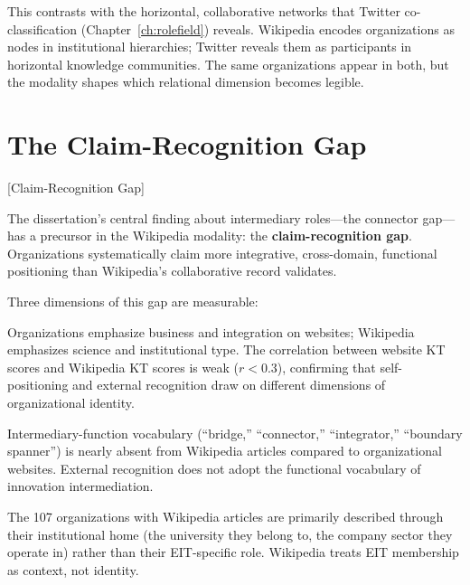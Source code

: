 \documentclass[../main.tex]{subfiles}
\begin{document}
This contrasts with the horizontal, collaborative networks that Twitter co-classification (Chapter~\ref{ch:rolefield}) reveals. Wikipedia encodes organizations as nodes in institutional hierarchies; Twitter reveals them as participants in horizontal knowledge communities. The same organizations appear in both, but the modality shapes which relational dimension becomes legible.


\section{The Claim-Recognition Gap}[Claim-Recognition Gap]

The dissertation's central finding about intermediary roles---the connector gap---has a precursor in the Wikipedia modality: the \textbf{claim-recognition gap}. Organizations systematically claim more integrative, cross-domain, functional positioning than Wikipedia's collaborative record validates.

Three dimensions of this gap are measurable:

\begin{description}[leftmargin=0.5cm, itemsep=0.4em]
\item[Knowledge Triangle divergence.] Organizations emphasize business and integration on websites; Wikipedia emphasizes science and institutional type. The correlation between website KT scores and Wikipedia KT scores is weak ($r < 0.3$), confirming that self-positioning and external recognition draw on different dimensions of organizational identity.

\item[Functional role erasure.] Intermediary-function vocabulary (``bridge,'' ``connector,'' ``integrator,'' ``boundary spanner'') is nearly absent from Wikipedia articles compared to organizational websites. External recognition does not adopt the functional vocabulary of innovation intermediation.

\item[Categorical anchoring.] The 107 organizations with Wikipedia articles are primarily described through their institutional home (the university they belong to, the company sector they operate in) rather than their EIT-specific role. Wikipedia treats EIT membership as context, not identity.
\end{description}
\end{document}
